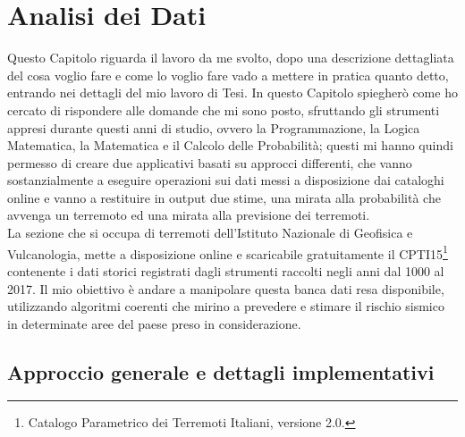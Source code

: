 \chapter{Analisi dei Dati}\label{iTerremotiInItalia}
Questo Capitolo riguarda il lavoro da me svolto, dopo una descrizione dettagliata del cosa voglio fare e come lo voglio fare vado a mettere in pratica quanto detto, entrando nei dettagli del mio lavoro di Tesi. In questo Capitolo spiegher\`o come ho cercato di rispondere alle domande che mi sono posto, sfruttando gli strumenti appresi durante questi anni di studio, ovvero la Programmazione, la Logica Matematica, la Matematica e il Calcolo delle Probabilit\`a; questi mi hanno quindi permesso di creare due applicativi basati su approcci differenti, che vanno sostanzialmente a eseguire operazioni sui dati messi a disposizione dai cataloghi online e vanno a restituire in output due stime, una mirata alla probabilit\`a che avvenga un terremoto ed una mirata alla previsione dei terremoti.\\
La sezione che si occupa di terremoti dell'Istituto Nazionale di Geofisica e Vulcanologia, mette a disposizione online e scaricabile gratuitamente il CPTI15\footnote{Catalogo Parametrico dei Terremoti Italiani, versione 2.0.} \cite{CPTI15} contenente i dati storici registrati dagli strumenti raccolti negli anni dal 1000 al 2017. Il mio obiettivo \`e andare a manipolare questa banca dati resa disponibile, utilizzando algoritmi coerenti che mirino a prevedere e stimare il rischio sismico in determinate aree del paese preso in considerazione.

\section{Approccio generale e dettagli implementativi}\label{dettagliImpl}

